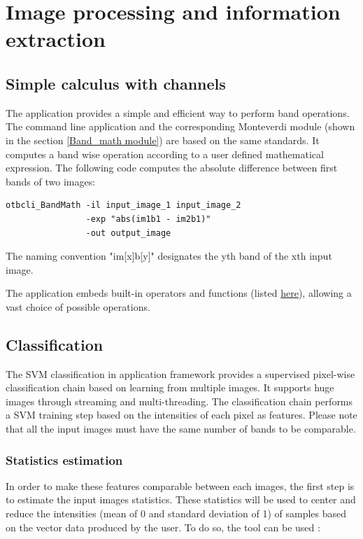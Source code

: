 \section{Image processing and information extraction}\label{sec:improc}

\subsection{Simple calculus with channels}\label{ssec:calculus}

The  application provides a simple and efficient
way to perform band operations. The command line application and the
corresponding Monteverdi module (shown in the section \ref{Band_math module})
are based on the same standards. It computes a band wise operation according
to a user defined mathematical expression. The following code computes the
absolute difference between first bands of two images:

\begin{verbatim}
otbcli_BandMath -il input_image_1 input_image_2
                -exp "abs(im1b1 - im2b1)"
                -out output_image
\end{verbatim}

The naming convention "im[x]b[y]" designates the yth band of the xth input image.

The  application embeds built-in operators and functions
(listed \href{http://muparser.sourceforge.net/mup_features.html#idDef2}{here}),
allowing a vast choice of possible operations.

\subsection{Classification}\label{ssec:classification}

The SVM classification in application framework provides a supervised pixel-wise
classification chain based on learning from multiple images. It supports huge
images through streaming and multi-threading.
The classification chain performs a SVM training step based on the intensities
of each pixel as features. Please note that all the input images must have the
same number of bands to be comparable.

\subsubsection{Statistics estimation}
In order to make these features comparable between each images, the first step
is to estimate the input images statistics. These statistics will be used to
center and reduce the intensities (mean of 0 and standard deviation of 1) of
samples based on the vector data produced by the user. To do so, the
 tool can be used :

